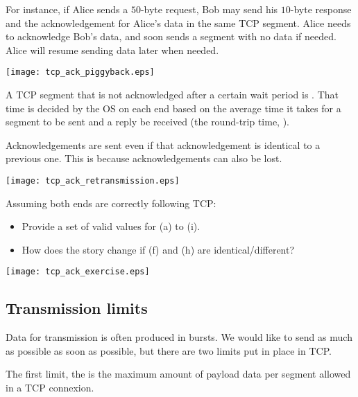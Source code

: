 For instance, if Alice sends a $50$-byte request, Bob may send his $10$-byte response
and the acknowledgement for Alice's data in the same TCP segment. Alice needs to acknowledge 
Bob's data, and soon sends a segment with no data if needed. Alice will resume sending 
data later when needed.

\begin{center}
\texttt{[image: tcp\_ack\_piggyback.eps]}
\end{center}

A TCP segment that is not acknowledged after a certain wait period is 
. That time is decided by the OS on each end
based on the average time it takes for a segment to be sent and a reply be received 
(the round-trip time, ).

Acknowledgements are sent even if that acknowledgement is identical to a previous one. This is because 
acknowledgements can also be lost.

\begin{center}
\texttt{[image: tcp\_ack\_retransmission.eps]}
\end{center}


\begin{exercise}
Assuming both ends are correctly following TCP:
\begin{itemize}
 \item Provide a set of valid values for (a) to (i).
 \item How does the story change if (f) and (h) are identical/different?
\end{itemize}

\begin{center}
\texttt{[image: tcp\_ack\_exercise.eps]}
\end{center}
\end{exercise}

\subsection{Transmission limits}

Data for transmission is often produced in bursts. We would like to send as much 
as possible as soon as possible, but there are two limits put in place in TCP.

The first limit, the  is the maximum amount of payload data
per segment allowed in a TCP connexion. 

